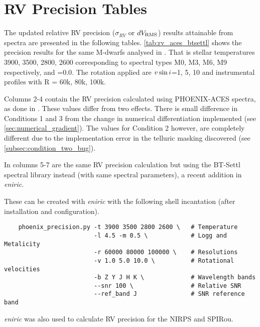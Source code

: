 
\chapter{RV Precision Tables} %

\label{app:nir_prec_amendment}

The updated relative RV precision ($\sigma_{RV}$ or $dV_{\textrm{RMS}}$) results attainable from \nir{} spectra are presented in the following tables.
\cref{tab:rv_aces_btsettl} shows the precision results for the same M-dwarfs analysed in \citep{figueira_radial_2016}.
That is stellar temperatures 3900, 3500, 2800, 2600\K{} corresponding to spectral types M0, M3, M6, M9 respectively,  and \feh{}=0.0.
The rotation applied are $v\sin{i}{}$=1, 5, 10\kmps{} and instrumental profiles with R = 60k, 80k, 100k.

Columns 2-4 contain the RV precision calculated using {PHOENIX-ACES} spectra, as done in \citet{figueira_radial_2016}.
These values differ from two effects.
There is small difference in Conditions 1 and 3 from the change in numerical differentiation implemented (see \cref{sec:numerical_gradient}).
The values for Condition 2 however, are completely different due to the implementation error in the telluric masking discovered (see \cref{subsec:condition_two_bug}).

In columns 5-7 are the same RV precision calculation but using the {BT-Settl} spectral library instead (with same spectral parameters), a recent addition in \emph{eniric}.


These can be created with \emph{eniric} with the following shell incantation (after installation and configuration).


\begin{lstlisting}
    phoenix_precision.py -t 3900 3500 2800 2600 \   # Temperature
                         -l 4.5 -m 0.5 \            # Logg and Metalicity
                         -r 60000 80000 100000 \    # Resolutions
                         -v 1.0 5.0 10.0 \          # Rotational velocities
                         -b Z Y J H K \             # Wavelength bands
                         --snr 100 \                # Relative SNR
                         --ref_band J               # SNR reference band
\end{lstlisting}


\emph{eniric} was also used to calculate {RV} precision for the {NIRPS} and {SPIRou}.

